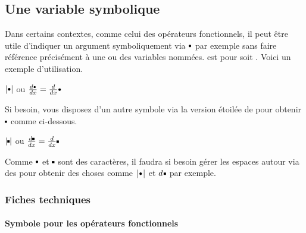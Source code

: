 \documentclass[12pt,a4paper]{article}
\begin{document}

\subsection{Une variable \og symbolique \fg{}}


Dans certains contextes, comme celui des opérateurs fonctionnels, il peut être utile d'indiquer un argument symboliquement via $\symvar$ par exemple sans faire référence précisément à une ou des variables nommées.
 est pour   soit .
Voici un exemple d'utilisation.

\begin{latexex}
 $| \symvar |$ ou
 $\frac{d\symvar}{dx}
= \frac{d}{dx}\symvar$
\end{latexex}


Si besoin, vous disposez d'un autre symbole via la version étoilée de  pour obtenir $\symvar*$ comme ci-dessous.

\begin{latexex}
 $| \symvar* |$ ou
 $\frac{d\symvar*}{dx}
= \frac{d}{dx}\symvar*$
\end{latexex}

\begin{remark}
	Comme $\symvar$ et $\symvar*$ sont des caractères, il faudra si besoin gérer les espaces autour via des  pour obtenir des choses comme  $|\kern.2ex\symvar\kern.2ex|$ et  $d\kern.25ex\symvar*$ par exemple.
\end{remark}





\subsubsection{Fiches techniques}

\paragraph{Symbole pour les opérateurs fonctionnels}


\end{document}
